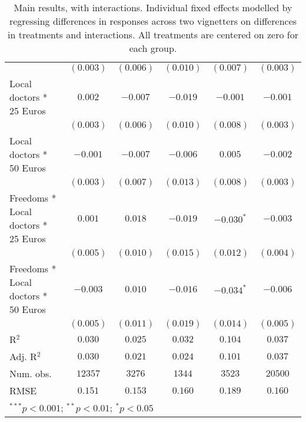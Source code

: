 \begin{table}[h!]
\begin{center}
\begin{tabular}{l c c c c c}
                                    & $(0.003)$      & $(0.006)$     & $(0.010)$     & $(0.007)$     & $(0.003)$      \\
Local doctors * 25 Euros            & $0.002$        & $-0.007$      & $-0.019$      & $-0.001$      & $-0.001$       \\
                                    & $(0.003)$      & $(0.006)$     & $(0.010)$     & $(0.008)$     & $(0.003)$      \\
Local doctors * 50 Euros            & $-0.001$       & $-0.007$      & $-0.006$      & $0.005$       & $-0.002$       \\
                                    & $(0.003)$      & $(0.007)$     & $(0.013)$     & $(0.008)$     & $(0.003)$      \\
Freedoms * Local doctors * 25 Euros & $0.001$        & $0.018$       & $-0.019$      & $-0.030^{*}$  & $-0.003$       \\
                                    & $(0.005)$      & $(0.010)$     & $(0.015)$     & $(0.012)$     & $(0.004)$      \\
Freedoms * Local doctors * 50 Euros & $-0.003$       & $0.010$       & $-0.016$      & $-0.034^{*}$  & $-0.006$       \\
                                    & $(0.005)$      & $(0.011)$     & $(0.019)$     & $(0.014)$     & $(0.005)$      \\
\hline
R$^2$                               & $0.030$        & $0.025$       & $0.032$       & $0.104$       & $0.037$        \\
Adj. R$^2$                          & $0.030$        & $0.021$       & $0.024$       & $0.101$       & $0.037$        \\
Num. obs.                           & $12357$        & $3276$        & $1344$        & $3523$        & $20500$        \\
RMSE                                & $0.151$        & $0.153$       & $0.160$       & $0.189$       & $0.160$        \\
\hline
\multicolumn{6}{l}{\scriptsize{$^{***}p<0.001$; $^{**}p<0.01$; $^{*}p<0.05$}}
\end{tabular}
\caption{Main results, with interactions. Individual fixed effects modelled by regressing differences in responses across two vignetters on differences in treatments and interactions. All treatments are centered on zero for each group.}
\label{table:coefficients}
\end{center}
\end{table}

